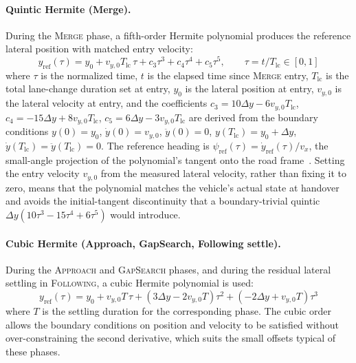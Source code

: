 \documentclass[12pt,a4paper,oneside]{report}
\begin{document}
\paragraph{Quintic Hermite (Merge).} During the \textsc{Merge} phase, a fifth-order Hermite polynomial produces the reference lateral position with matched entry velocity:
\begin{equation}
y_{\text{ref}}(\tau) = y_0 + v_{y,0} T_{\text{lc}} \, \tau + c_3 \tau^3 + c_4 \tau^4 + c_5 \tau^5, \qquad \tau = t / T_{\text{lc}} \in [0, 1]
\label{eq:quintic_merge}
\end{equation}
where $\tau$ is the normalized time, $t$ is the elapsed time since \textsc{Merge} entry, $T_{\text{lc}}$ is the total lane-change duration set at entry, $y_0$ is the lateral position at entry, $v_{y,0}$ is the lateral velocity at entry, and the coefficients $c_3 = 10 \Delta y - 6 v_{y,0} T_{\text{lc}}$, $c_4 = -15 \Delta y + 8 v_{y,0} T_{\text{lc}}$, $c_5 = 6 \Delta y - 3 v_{y,0} T_{\text{lc}}$ are derived from the boundary conditions $y(0) = y_0$, $\dot{y}(0) = v_{y,0}$, $\ddot{y}(0) = 0$, $y(T_{\text{lc}}) = y_0 + \Delta y$, $\dot{y}(T_{\text{lc}}) = \ddot{y}(T_{\text{lc}}) = 0$. The reference heading is $\psi_{\text{ref}}(\tau) = \dot{y}_{\text{ref}}(\tau) / v_x$, the small-angle projection of the polynomial's tangent onto the road frame~\cite{rajamaniVehicleDynamicsControl2005}. Setting the entry velocity $v_{y,0}$ from the measured lateral velocity, rather than fixing it to zero, means that the polynomial matches the vehicle's actual state at handover and avoids the initial-tangent discontinuity that a boundary-trivial quintic $\Delta y (10\tau^3 - 15\tau^4 + 6\tau^5)$ would introduce.

\paragraph{Cubic Hermite (Approach, GapSearch, Following settle).} During the \textsc{Approach} and \textsc{GapSearch} phases, and during the residual lateral settling in \textsc{Following}, a cubic Hermite polynomial is used:
\begin{equation}
y_{\text{ref}}(\tau) = y_0 + v_{y,0} T \, \tau + (3 \Delta y - 2 v_{y,0} T) \tau^2 + (- 2 \Delta y + v_{y,0} T) \tau^3
\label{eq:cubic_gapsearch}
\end{equation}
where $T$ is the settling duration for the corresponding phase. The cubic order allows the boundary conditions on position and velocity to be satisfied without over-constraining the second derivative, which suits the small offsets typical of these phases.
\end{document}
